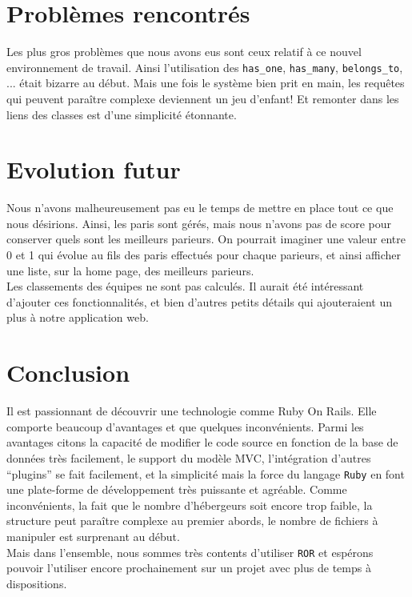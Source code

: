 \documentclass[10pt,a4paper,titlepage]{article}
\begin{document}
\section{Problèmes rencontrés}

Les plus gros problèmes que nous avons eus sont ceux relatif à ce nouvel environnement de travail. Ainsi l'utilisation des \texttt{has\_one}, \texttt{has\_many}, \texttt{belongs\_to}, ... était bizarre au début. Mais une fois le système bien prit en main, les requêtes qui peuvent paraître complexe deviennent un jeu d'enfant! Et remonter dans les liens des classes est d'une simplicité étonnante. 


\section{Evolution futur}

Nous n'avons malheureusement pas eu le temps de mettre en place tout ce que nous désirions. Ainsi, les paris sont gérés, mais nous n'avons pas de score pour conserver quels sont les meilleurs parieurs. On pourrait imaginer une valeur entre 0 et 1 qui évolue au fils des paris effectués pour chaque parieurs, et ainsi afficher une liste, sur la home page, des meilleurs parieurs. \\

Les classements des équipes ne sont pas calculés. Il aurait été intéressant d'ajouter ces fonctionnalités, et bien d'autres petits détails qui ajouteraient un plus à notre application web.


\section{Conclusion}

Il est passionnant de découvrir une technologie comme Ruby On Rails. Elle comporte beaucoup d'avantages et que quelques inconvénients. Parmi les avantages citons la capacité de modifier le code source en fonction de la base de données très facilement, le support du modèle MVC, l'intégration d'autres “plugins” se fait facilement, et la simplicité mais la force du langage \texttt{Ruby} en font une plate-forme de développement très puissante et agréable. Comme inconvénients, la fait que le nombre d'hébergeurs soit encore trop faible, la structure peut paraître complexe au premier abords, le nombre de fichiers à manipuler est surprenant au début.\\

Mais dans l'ensemble, nous sommes très contents d'utiliser \texttt{ROR} et espérons pouvoir l'utiliser encore prochainement sur un projet avec plus de temps à dispositions. 
\end{document}
